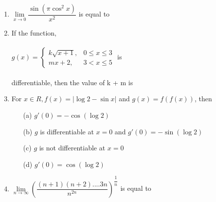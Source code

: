 \begin{enumerate}[label=\arabic*.,ref=\thesubsection.\theenumi]
\item $\lim\limits_{x \to 0}\dfrac{\sin(\pi\cos^2x)}{x^2}$ is equal to
\begin{itemize}
\end{itemize}

\item If the function,\\ \\
$g(x)=\begin{cases}
k\sqrt{x+1}, &\text{$0\leq x \leq 3$}\\
mx+2, &\text{$3<x\leq 5$}
\end{cases}$ is \\ \\differentiable, then the value of k + m is
\begin{itemize}
\end{itemize}

\item For $x \in R, f(x)=|\log 2-\sin x|$ and $g(x)=f(f(x))$, then
\begin{itemize}
\item[(a)] $g'(0)=-\cos(\log 2)$
\item[(b)] $g$ is differentiable at $x=0$ and $g'(0)=-\sin(\log 2)$
\item[(c)] $g$ is not differentiable at $x=0$
\item[(d)] $g'(0)=\cos(\log 2)$
\end{itemize}

\item $\lim\limits_{n \to \infty}\left(\dfrac{(n+1)(n+2)....3n}{n^{2n}}\right)^{\dfrac{1}{n}}$ is equal to
\begin{itemize}
\end{itemize}


\end{enumerate}
